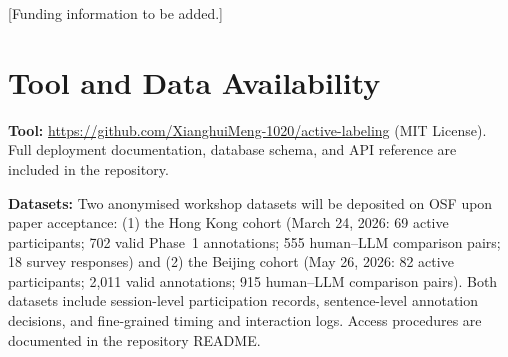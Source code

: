 \documentclass[fleqn,10pt]{JLA_article}
\begin{document}
[Funding information to be added.]

\section*{Tool and Data Availability}

\textbf{Tool:} \url{https://github.com/XianghuiMeng-1020/active-labeling} (MIT License).
Full deployment documentation, database schema, and API reference are included in the
repository.

\textbf{Datasets:} Two anonymised workshop datasets will be deposited on OSF upon paper
acceptance: (1) the Hong Kong cohort (March 24, 2026: 69 active participants; 702 valid
Phase~1 annotations; 555 human--LLM comparison pairs; 18 survey responses) and (2) the
Beijing cohort (May 26, 2026: 82 active participants; 2,011 valid annotations; 915
human--LLM comparison pairs). Both datasets include session-level participation records,
sentence-level annotation decisions, and fine-grained timing and interaction logs.
Access procedures are documented in the repository README.


\end{document}
